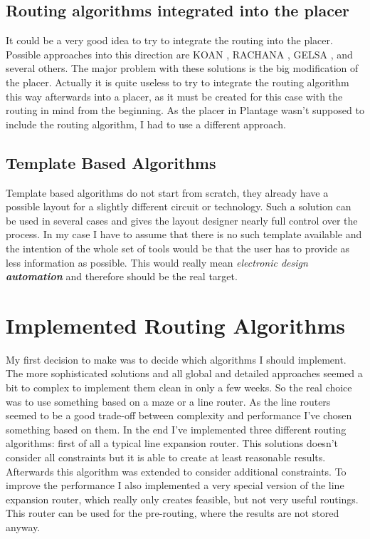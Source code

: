 \subsection{Routing algorithms integrated into the placer}
It could be a very good idea to try to integrate the routing into the placer. Possible approaches into this direction are KOAN \cite[page 178]{springer:eda_analog_routing}, RACHANA \cite[page 178]{springer:eda_analog_routing}, GELSA \cite[page 179]{springer:eda_analog_routing}, and several others. The major problem with these solutions is the big modification of the placer. Actually it is quite useless to try to integrate the routing algorithm this way afterwards into a placer, as it must be created for this case with the routing in mind from the beginning. As the placer in Plantage wasn't supposed to include the routing algorithm, I had to use a different approach.

\subsection{Template Based Algorithms}
Template based algorithms do not start from scratch, they already have a possible layout for a slightly different circuit or technology. Such a solution can be used in several cases and gives the layout designer nearly full control over the process. In my case I have to assume that there is no such template available and the intention of the whole set of tools would be that the user has to provide as less information as possible. This would really mean \textit{electronic design \textbf{automation}} and therefore should be the real target.

\section{Implemented Routing Algorithms}
\label{sec:implemented_algorithms}
My first decision to make was to decide which algorithms I should implement. The more sophisticated solutions and all global and detailed approaches seemed a bit to complex to implement them clean in only a few weeks. So the real choice was to use something based on a maze or a line router. As the line routers seemed to be a good trade-off between complexity and performance I've chosen something based on them. In the end I've implemented three different routing algorithms: first of all a typical line expansion router. This solutions doesn't consider all constraints but it is able to create at least reasonable results. Afterwards this algorithm was extended to consider additional constraints. To improve the performance I also implemented a very special version of the line expansion router, which really only creates feasible, but not very useful routings. This router can be used for the pre-routing, where the results are not stored anyway.

